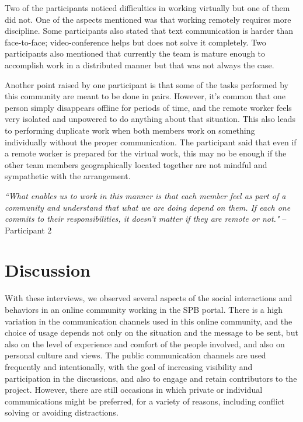 \documentclass{sigchi}
\begin{document}
Two of the participants noticed difficulties in working virtually but one of them did not. One of the aspects mentioned was that working remotely requires more discipline. Some participants also stated that text communication is harder than face-to-face; video-conference helps but does not solve it completely. Two participants also mentioned that currently the team is mature enough to accomplish work in a distributed manner but that was not always the case. 

Another point raised by one participant is that some of the tasks performed by this community are meant to be done in pairs. However, it's common that one person simply disappears offline for periods of time, and the remote worker feels very isolated and unpowered to do anything about that situation. This also leads to performing duplicate work when both members work on something individually without the proper communication. The participant said that even if a remote worker is prepared for the virtual work, this may no be enough if the other team members geographically located together are not mindful and sympathetic with the arrangement.

\begin{displayquote}
\textit{``What enables us to work in this manner is that each member feel as part of a community and understand that what we are doing depend on them. If each one commits to their responsibilities, it doesn't matter if they are remote or not."} – Participant 2
\end{displayquote}

\section{Discussion}

With these interviews, we observed several aspects of the social interactions and behaviors in an online community working in the SPB portal. There is a high variation in the communication channels used in this online community, and the choice of usage depends not only on the situation and the message to be sent, but also on the level of experience and comfort of the people involved, and also on personal culture and views. The public communication channels are used frequently and  intentionally, with the goal of increasing visibility and participation in the discussions, and also to engage and retain contributors to the project. However, there are still occasions in which private or individual communications might be preferred, for a variety of reasons, including conflict solving or avoiding distractions.
\end{document}
